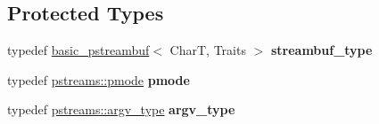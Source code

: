 \subsection*{Protected Types}
\begin{DoxyCompactItemize}
\item 
\mbox{\label{classredi_1_1pstream__common_a7c3039b2db5ac78069d4c8022e700bd8}} 
typedef \mbox{\hyperlink{classredi_1_1basic__pstreambuf}{basic\+\_\+pstreambuf}}$<$ CharT, Traits $>$ {\bfseries streambuf\+\_\+type}
\item 
\mbox{\label{classredi_1_1pstream__common_a1359431898a2484b3b33dc225cfc84e8}} 
typedef \mbox{\hyperlink{structredi_1_1pstreams_a1eae4aad88812af03a0fbb3ec13c50b7}{pstreams\+::pmode}} {\bfseries pmode}
\item 
\mbox{\label{classredi_1_1pstream__common_a292538074144e8d567ac6f09fc4c3f3b}} 
typedef \mbox{\hyperlink{structredi_1_1pstreams_af902b894b095c1875e96c10129489467}{pstreams\+::argv\+\_\+type}} {\bfseries argv\+\_\+type}
\end{DoxyCompactItemize}
